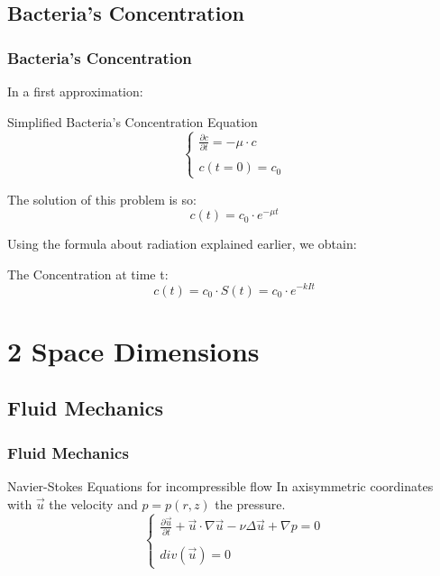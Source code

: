\documentclass[xcolor=dvipsnames,10pt]{beamer}
\begin{document}
\subsection{Bacteria's Concentration}

\begin{frame}
	\frametitle{Bacteria's Concentration}
In a first approximation:
 \begin{block}{Simplified Bacteria's Concentration Equation}
\begin{equation}
\left\{ \begin{array}{cl}
\frac{\partial{c}}{\partial{t}}= -\mu\cdot c\\
\\
c(t=0)=c_0
\end{array}
\right.
\end{equation}

 The solution of this problem is so: 
\begin{equation}
c(t) = c_0\cdot e^{-\mu t}
\end{equation}
\end{block}

Using the formula about radiation explained earlier, we obtain: 
\begin{block}{The Concentration at time t:}
\begin{equation}
c(t) = c_0\cdot S(t) = c_0\cdot e^{-kIt}
\end{equation}
\end{block}
\end{frame}



\section{2 Space Dimensions}

\subsection{Fluid Mechanics}

\begin{frame}
	\frametitle{Fluid Mechanics}
		\begin{block}{Navier-Stokes Equations for incompressible flow}
			In axisymmetric coordinates with $\vec{u}$ the velocity and $p=p(r,z)$ the pressure.
			\begin{equation}
				\left\{ \begin{array}{cl}
				\frac{\partial \vec{u}}{\partial t} + \vec{u}\cdot \nabla \vec{u} - \nu\Delta\vec{u} + \nabla p = 0 \\
				\\
				div(\vec{u}) = 0
				\end{array}
				\right.
			\end{equation}
		\end{block}
\end{frame}
\end{document}
